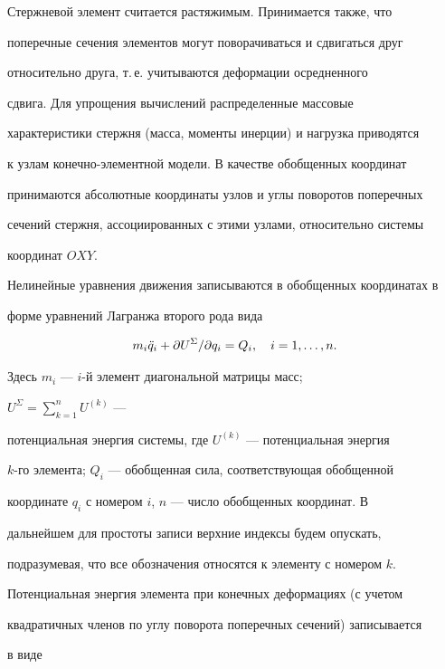 \noindent{}Стержневой элемент считается растяжимым. Принимается также, что 


поперечные сечения элементов могут поворачиваться и сдвигаться друг 


относительно друга, т.\,е. учитываются деформации осредненного 


сдвига. Для упрощения вычислений распределенные массовые 


характеристики стержня (масса, моменты инерции) и нагрузка приводятся 


к узлам конечно-элементной модели. В качестве обобщенных координат 


принимаются абсолютные координаты узлов и углы поворотов поперечных 


сечений стержня, ассоциированных с этими узлами, относительно системы 


координат $OXY$. 


 


Нелинейные уравнения движения записываются в обобщенных координатах в 


форме уравнений Лагранжа второго рода вида


$$ 


m_i\Ddot q_i+\partial U^\Sigma/\partial q_i=Q_i,\quad 


i=1,\dotsc,n. 


$$ 


Здесь $m_i$ --- $i$-й элемент диагональной матрицы масс; 


$U^\Sigma=\sum\limits^n_{k=1}U^{(k)}$ --- 


потенциальная энергия системы, где $U^{(k)}$ --- потенциальная энергия 


$k$-го элемента; $Q_i$ --- обобщенная сила, соответствующая обобщенной 


координате $q_i$ с номером $i$, $n$ --- число обобщенных координат. В 


дальнейшем для простоты записи верхние индексы будем опускать, 


подразумевая, что все обозначения относятся к элементу с номером $k$. 


 


Потенциальная энергия элемента при конечных деформациях (с учетом 


квадратичных членов по углу поворота поперечных сечений) записывается 


в виде 


$$ 


